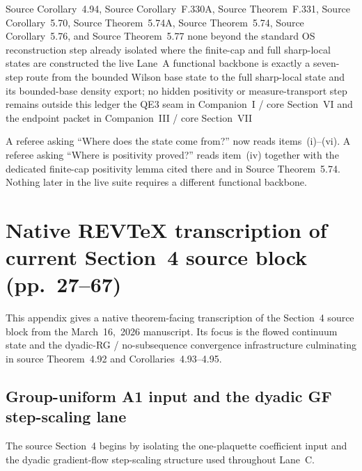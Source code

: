 \documentclass[preprint,aip,jmp,amsmath,amssymb,nofootinbib]{revtex4-2}
\begin{document}
\dependencyledger
  {Source Corollary~4.94, Source Corollary~F.330A, Source Theorem~F.331, Source Corollary~5.70, Source Theorem~5.74A, Source Theorem~5.74, Source Corollary~5.76, and Source Theorem~5.77}
  {none beyond the standard OS reconstruction step already isolated where the finite-cap and full sharp-local states are constructed}
  {the live Lane~A functional backbone is exactly a seven-step route from the bounded Wilson base state to the full sharp-local state and its bounded-base density export; no hidden positivity or measure-transport step remains outside this ledger}
  {the QE3 seam in Companion~I / core Section~VI and the endpoint packet in Companion~III / core Section~VII}

\begin{remark}
A referee asking ``Where does the state come from?'' now reads items~\textup{(i)}--\textup{(vi)}. A referee asking ``Where is positivity proved?'' reads item~\textup{(iv)} together with the dedicated finite-cap positivity lemma cited there and in Source Theorem~5.74. Nothing later in the live suite requires a different functional backbone.
\end{remark}

\SuiteDataAvailabilitySection

\appendix

\section{Native REV\TeX{} transcription of current Section~4 source block (pp.~27--67)}
This appendix gives a native theorem-facing transcription of the Section~4 source block from the March~16,~2026 manuscript. Its focus is the flowed continuum state and the dyadic-RG / no-subsequence convergence infrastructure culminating in source Theorem~4.92 and Corollaries~4.93--4.95.

\subsection{Group-uniform A1 input and the dyadic GF step-scaling lane}
The source Section~4 begins by isolating the one-plaquette coefficient input and the dyadic gradient-flow step-scaling structure used throughout Lane~C.
\end{document}
